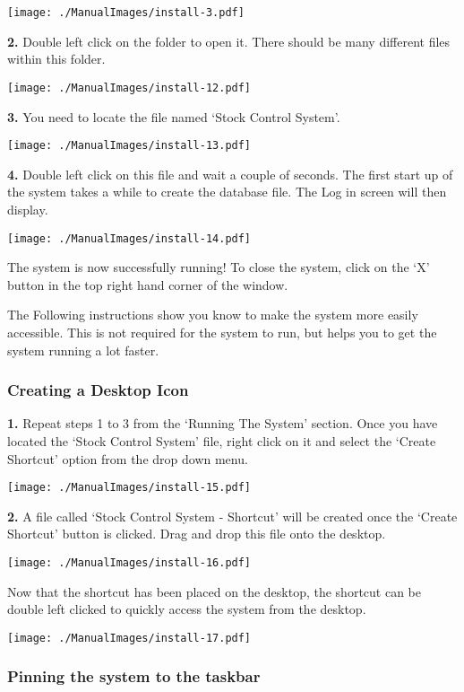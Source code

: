 \texttt{[image: ./ManualImages/install-3.pdf]}

\textbf{2.} Double left click on the folder to open it. There should be many different files within this folder.

\texttt{[image: ./ManualImages/install-12.pdf]}

\textbf{3.} You need to locate the file named `Stock Control System'.

\texttt{[image: ./ManualImages/install-13.pdf]}

\textbf{4.} Double left click on this file and wait a couple of seconds. The first start up of the system takes a while to create the database file. The Log in screen will then display.

\texttt{[image: ./ManualImages/install-14.pdf]}

The system is now successfully running! To close the system, click on the `X' button in the top right hand corner of the window.

\pagebreak

The Following instructions show you know to make the system more easily accessible. This is not required for the system to run, but helps you to get the system running a lot faster.

\subsubsection{Creating a Desktop Icon}

\textbf{1.} Repeat steps 1 to 3 from the `Running The System' section. Once you have located the `Stock Control System' file, right click on it and select the `Create Shortcut' option from the drop down menu.

\texttt{[image: ./ManualImages/install-15.pdf]}

\textbf{2.} A file called `Stock Control System - Shortcut' will be created once the `Create Shortcut' button is clicked. Drag and drop this file onto the desktop.

\texttt{[image: ./ManualImages/install-16.pdf]}

Now that the shortcut has been placed on the desktop, the shortcut can be double left clicked to quickly access the system from the desktop.

\texttt{[image: ./ManualImages/install-17.pdf]}

\subsubsection{Pinning the system to the taskbar}

